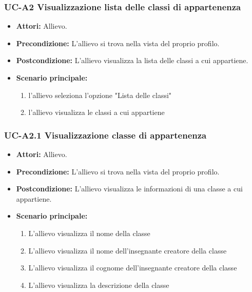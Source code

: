 	\subsubsection{UC-A2 Visualizzazione lista delle classi di appartenenza}
		\begin{itemize}
			\item \textbf{Attori:} Allievo.
			\item \textbf{Precondizione:} L'allievo si trova nella vista del proprio profilo.
			\item \textbf{Postcondizione:} L'allievo visualizza la lista delle classi a cui appartiene.
			\item \textbf{Scenario principale:}
			\begin{enumerate}
				\item l'allievo seleziona l'opzione "Lista delle classi"
				\item l'allievo visualizza le classi a cui appartiene
			\end{enumerate}
		\end{itemize}			

\subsubsection{UC-A2.1 Visualizzazione classe di appartenenza}
		\begin{itemize}
			\item \textbf{Attori:} Allievo.
			\item \textbf{Precondizione:} L'allievo si trova nella vista del proprio profilo.
			\item \textbf{Postcondizione:} L'allievo visualizza le informazioni di una classe a cui appartiene.
			\item \textbf{Scenario principale:}
			\begin{enumerate}
				\item L'allievo visualizza il nome della classe
				\item L'allievo visualizza il nome dell'insegnante creatore della classe
				\item L'allievo visualizza il cognome dell'insegnante creatore della classe
				\item L'allievo visualizza la descrizione della classe
			\end{enumerate}
		\end{itemize}	

